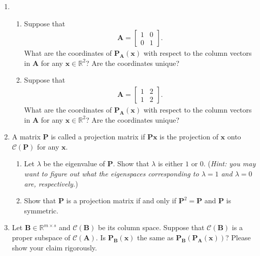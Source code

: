 \documentclass[11pt,letter,notitlepage]{article}
\newcommand{\proj}[2]{\textbf{P}_{#2} (#1)}
\theoremstyle{definition}
\begin{document}
\begin{exercise}[Projection ]
\begin{enumerate}
			\item  
			\begin{enumerate}
				\item Suppose that 
				\begin{align*}
					\mathbf{A} = \left[
					\begin{matrix}
						1 & 0\\
						0 & 1
					\end{matrix}
					\right] .
				\end{align*}
				What are the coordinates of $\mathbf{P}_{\mathbf{A}}(\mathbf{x})$ with respect to the column vectors in $\mathbf{A}$ for any $\mathbf{x} \in \mathbb{R}^2$? Are the coordinates unique?
				\item Suppose that
				\begin{align*}
					\mathbf{A} = \left[
					\begin{matrix}
						1 & 2\\
						1 & 2
					\end{matrix}
					\right] .
				\end{align*}
				What are the coordinates of $\mathbf{P}_{\mathbf{A}}(\mathbf{x})$ with respect to the column vectors in $\mathbf{A}$ for any $\mathbf{x} \in \mathbb{R}^2$? Are the coordinates unique?
			\end{enumerate}
			
			\item A matrix $\mathbf{P}$ is called a projection matrix if $\mathbf{P}\mathbf{x}$ is the projection of $\mathbf{x}$ onto $\mathcal{C}(\mathbf{P})$ for any $\mathbf{x}$.
			\begin{enumerate}
				\item Let $\lambda$ be the eigenvalue of $\mathbf{P}$. Show that $\lambda$ is either $1$ or $0$. (\emph{Hint: you may want to figure out what the eigenspaces corresponding to $\lambda=1$ and $\lambda=0$ are, respectively.})
				\item Show that $\mathbf{P}$ is a projection matrix if and only if $\mathbf{P}^2 = \mathbf{P}$ and $\mathbf{P}$ is symmetric.
			\end{enumerate}
			
			\item Let $\mathbf{B} \in \mathbb{R}^{m\times s}$ and $\mathcal{C}(\mathbf{B}) $ be its column space. Suppose that $\mathcal{C}(\mathbf{B})$ is a proper subspace of $ \mathcal{C}(\mathbf{A})$. 
			Is $\proj{\mathbf{x}}{\mathbf{B}}$ the same as $\proj{\proj{\mathbf{x}}{\mathbf{A}}}{\mathbf{B}}$? Please show your claim rigorously.
		\end{enumerate}
	\end{exercise}
	
\end{document}
